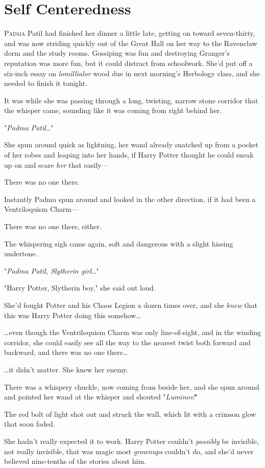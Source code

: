 \chapter{Self Centeredness}

\lettrine{P}{adma} Patil had
finished her dinner a little late, getting on toward seven-thirty, and was now
striding quickly out of the Great Hall on her way to the Ravenclaw dorm and the
study rooms. Gossiping was fun and destroying Granger’s reputation was more
fun, but it could distract from schoolwork. She’d put off a six-inch essay on
\emph{lomillialor} wood due in next morning’s Herbology class, and she needed
to finish it tonight.

It was while she was passing through a long, twisting, narrow stone corridor
that the whisper came, sounding like it was coming from right behind her.

"\emph{Padma Patil…}"

She spun around quick as lightning, her wand already snatched up from a pocket
of her robes and leaping into her hands, if Harry Potter thought he could sneak
up on and scare \emph{her} that easily—

There was no one there.

Instantly Padma spun around and looked in the other direction, if it had been a
Ventriloquism Charm—

There was no one there, either.

The whispering sigh came again, soft and dangerous with a slight hissing
undertone.

"\emph{Padma Patil, Slytherin girl…}"

"Harry Potter, Slytherin boy," she said out loud.

She’d fought Potter and his Chaos Legion a dozen times over, and she
\emph{knew} that this was Harry Potter doing this somehow…

…even though the Ventriloquism Charm was only line-of-sight, and in the
winding corridor, she could easily see all the way to the nearest twist both
forward and backward, and there was no one there…

…it didn’t matter. She knew her enemy.

There was a whispery chuckle, now coming from beside her, and she spun around
and pointed her wand at the whisper and shouted "\emph{Luminos!}"

The red bolt of light shot out and struck the wall, which lit with a crimson
glow that soon faded.

She hadn’t really expected it to work. Harry Potter couldn’t \emph{possibly} be
invisible, not really invisible, that was magic most \emph{grownups} couldn’t
do, and she’d never believed nine-tenths of the stories about him.

